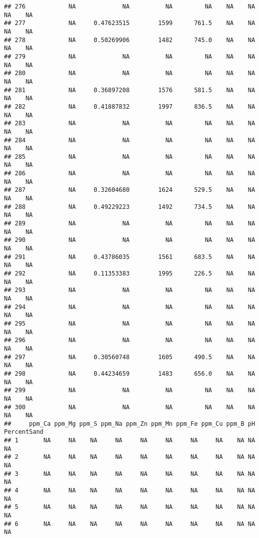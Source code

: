 \documentclass[]{article}
\begin{document}
\begin{verbatim}
## 276            NA             NA          NA         NA    NA    NA    NA    NA
## 277            NA     0.47623515        1599      761.5    NA    NA    NA    NA
## 278            NA     0.50269906        1482      745.0    NA    NA    NA    NA
## 279            NA             NA          NA         NA    NA    NA    NA    NA
## 280            NA             NA          NA         NA    NA    NA    NA    NA
## 281            NA     0.36897208        1576      581.5    NA    NA    NA    NA
## 282            NA     0.41887832        1997      836.5    NA    NA    NA    NA
## 283            NA             NA          NA         NA    NA    NA    NA    NA
## 284            NA             NA          NA         NA    NA    NA    NA    NA
## 285            NA             NA          NA         NA    NA    NA    NA    NA
## 286            NA             NA          NA         NA    NA    NA    NA    NA
## 287            NA     0.32604680        1624      529.5    NA    NA    NA    NA
## 288            NA     0.49229223        1492      734.5    NA    NA    NA    NA
## 289            NA             NA          NA         NA    NA    NA    NA    NA
## 290            NA             NA          NA         NA    NA    NA    NA    NA
## 291            NA     0.43786035        1561      683.5    NA    NA    NA    NA
## 292            NA     0.11353383        1995      226.5    NA    NA    NA    NA
## 293            NA             NA          NA         NA    NA    NA    NA    NA
## 294            NA             NA          NA         NA    NA    NA    NA    NA
## 295            NA             NA          NA         NA    NA    NA    NA    NA
## 296            NA             NA          NA         NA    NA    NA    NA    NA
## 297            NA     0.30560748        1605      490.5    NA    NA    NA    NA
## 298            NA     0.44234659        1483      656.0    NA    NA    NA    NA
## 299            NA             NA          NA         NA    NA    NA    NA    NA
## 300            NA             NA          NA         NA    NA    NA    NA    NA
##     ppm_Ca ppm_Mg ppm_S ppm_Na ppm_Zn ppm_Mn ppm_Fe ppm_Cu ppm_B pH PercentSand
## 1       NA     NA    NA     NA     NA     NA     NA     NA    NA NA          NA
## 2       NA     NA    NA     NA     NA     NA     NA     NA    NA NA          NA
## 3       NA     NA    NA     NA     NA     NA     NA     NA    NA NA          NA
## 4       NA     NA    NA     NA     NA     NA     NA     NA    NA NA          NA
## 5       NA     NA    NA     NA     NA     NA     NA     NA    NA NA          NA
## 6       NA     NA    NA     NA     NA     NA     NA     NA    NA NA          NA

\end{verbatim}
\end{document}

